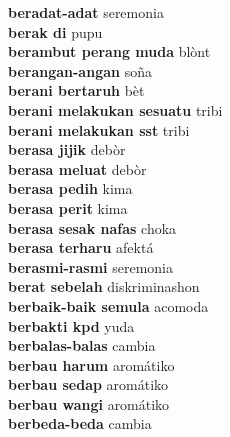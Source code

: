 \textbf{ beradat-adat  } seremonia \\
\textbf{ berak di  } pupu \\
\textbf{ berambut perang muda  } blònt \\
\textbf{ berangan-angan  } soña \\
\textbf{ berani bertaruh  } bèt \\
\textbf{ berani melakukan sesuatu  } tribi \\
\textbf{ berani melakukan sst  } tribi \\
\textbf{ berasa jijik  } debòr \\
\textbf{ berasa meluat  } debòr \\
\textbf{ berasa pedih  } kima \\
\textbf{ berasa perit  } kima \\
\textbf{ berasa sesak nafas  } choka \\
\textbf{ berasa terharu  } afektá \\
\textbf{ berasmi-rasmi  } seremonia \\
\textbf{ berat sebelah  } diskriminashon \\
\textbf{ berbaik-baik semula  } acomoda \\
\textbf{ berbakti kpd  } yuda \\
\textbf{ berbalas-balas  } cambia \\
\textbf{ berbau harum  } aromátiko \\
\textbf{ berbau sedap  } aromátiko \\
\textbf{ berbau wangi  } aromátiko \\
\textbf{ berbeda-beda  } cambia \\
